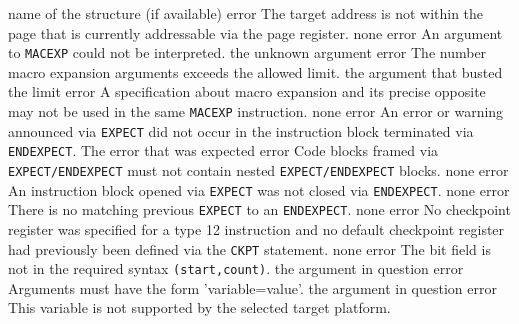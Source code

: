 \documentclass[12pt,twoside]{report}
\newcommand{\tty}[1]{{\tt #1}}
\begin{document}
\begin{description}
               {name of the structure (if available)}
               {error}
               {The target address is not within the page
                that is currently addressable via the page
                register.}
               {none}
               {error}
               {An argument to \tty{MACEXP} could not be
                interpreted.}
               {the unknown argument}
               {error}
               {The number macro expansion arguments exceeds the allowed limit.}
               {the argument that busted the limit}
               {error}
               {A specification about macro expansion and its
                precise opposite may not be used in the same
                \tty{MACEXP} instruction.}
               {none}
               {error}
               {An error or warning announced via {\tt EXPECT} did not occur in the
                instruction block terminated via {\tt ENDEXPECT}.}
               {The error that was expected}
               {error}
               {Code blocks framed via {\tt EXPECT/ENDEXPECT} must not contain
                nested {\tt EXPECT/ENDEXPECT} blocks.}
               {none}
               {error}
               {An instruction block opened via {\tt EXPECT} was not closed via
                {\tt ENDEXPECT}.}
               {none}
               {error}
               {There is no matching previous {\tt EXPECT} to an {\tt ENDEXPECT}.}
               {none}
               {error}
               {No checkpoint register was specified for a type 12 instruction
                and no default checkpoint register had previously been defined
                via the {\tt CKPT} statement.}
               {none}
               {error}
               {The bit field is not in the required syntax {\tt (start,count)}.}
               {the argument in question}
               {error}
               {Arguments must have the form 'variable=value'.}
               {the argument in question}
               {error}
               {This variable is not supported by the selected target platform.}

\end{description}
\end{document}
